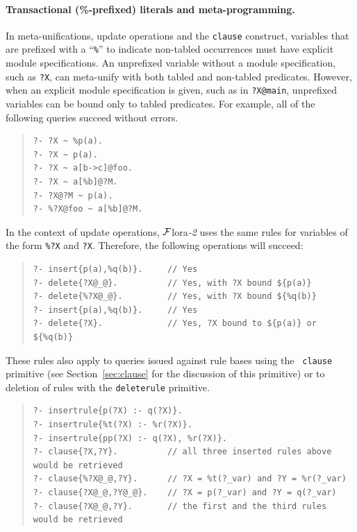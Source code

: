 \documentclass[11pt]{article}
\newcommand{\FLORA}{{\mbox{\sc ${\cal F}${lora}\rm\emph{-2}}}\xspace}
\begin{document}
\paragraph{Transactional (\%-prefixed) literals and meta-programming.}
In meta-unifications, update operations and the {\tt clause} construct,
variables that are prefixed with a ``{\tt \%}'' to indicate non-tabled
occurrences must have explicit module specifications. An unprefixed
variable without a module specification, such as {\tt ?X}, can meta-unify
with both tabled and non-tabled predicates.  However, when an explicit
module specification is given, such as in {\tt ?X@main}, unprefixed
variables can be bound only to tabled predicates. For example,
all of the following queries succeed without errors.

\begin{quote}
\begin{verbatim}
?- ?X ~ %p(a).      
?- ?X ~ p(a).         
?- ?X ~ a[b->c]@foo.  
?- ?X ~ a[%b]@?M.      
?- ?X@?M ~ p(a).     
?- %?X@foo ~ a[%b]@?M.
\end{verbatim}
\end{quote}

In the context of update operations, \FLORA uses the same rules for
variables of the form {\tt \%?X} and {\tt ?X}. Therefore, the
following operations will succeed:
\begin{quote}
\begin{verbatim}
?- insert{p(a),%q(b)}.     // Yes
?- delete{?X@_@}.          // Yes, with ?X bound ${p(a)}
?- delete{%?X@_@}.         // Yes, with ?X bound ${%q(b)}
?- insert{p(a),%q(b)}.     // Yes
?- delete{?X}.             // Yes, ?X bound to ${p(a)} or ${%q(b)}
\end{verbatim}
\end{quote}

These rules also apply to queries issued against rule bases using the {\tt
  clause} primitive (see Section~\ref{sec:clause} for the discussion of this
primitive) or to deletion of rules with the {\tt deleterule} primitive.

\begin{quote}
\begin{verbatim}
?- insertrule{p(?X) :- q(?X)}.  
?- insertrule{%t(?X) :- %r(?X)}.
?- insertrule{pp(?X) :- q(?X), %r(?X)}.
?- clause{?X,?Y}.          // all three inserted rules above would be retrieved
?- clause{%?X@_@,?Y}.      // ?X = %t(?_var) and ?Y = %r(?_var)
?- clause{?X@_@,?Y@_@}.    // ?X = p(?_var) and ?Y = q(?_var)
?- clause{?X@_@,?Y}.       // the first and the third rules would be retrieved
\end{verbatim}
\end{quote}
\end{document}
